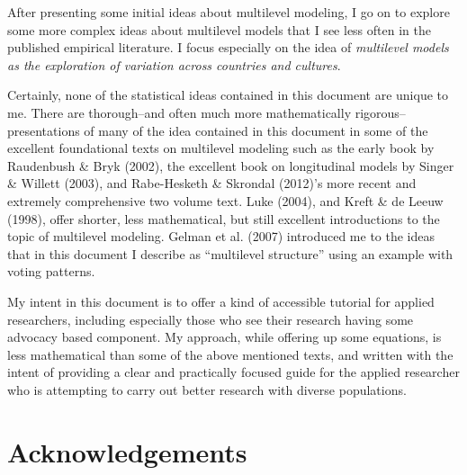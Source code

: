 \documentclass[
  letterpaper,
  DIV=11,
  numbers=noendperiod]{scrreprt}
\begin{document}
After presenting some initial ideas about multilevel modeling, I go on
to explore some more complex ideas about multilevel models that I see
less often in the published empirical literature. I focus especially on
the idea of \emph{multilevel models as the exploration of variation
across countries and cultures}.

Certainly, none of the statistical ideas contained in this document are
unique to me. There are thorough--and often much more mathematically
rigorous--presentations of many of the idea contained in this document
in some of the excellent foundational texts on multilevel modeling such
as the early book by Raudenbush \& Bryk (2002), the excellent book on
longitudinal models by Singer \& Willett (2003), and Rabe-Hesketh \&
Skrondal (2012)'s more recent and extremely comprehensive two volume
text. Luke (2004), and Kreft \& de Leeuw (1998), offer shorter, less
mathematical, but still excellent introductions to the topic of
multilevel modeling. Gelman et al. (2007) introduced me to the ideas
that in this document I describe as ``multilevel structure'' using an
example with voting patterns.

My intent in this document is to offer a kind of accessible tutorial for
applied researchers, including especially those who see their research
having some advocacy based component. My approach, while offering up
some equations, is less mathematical than some of the above mentioned
texts, and written with the intent of providing a clear and practically
focused guide for the applied researcher who is attempting to carry out
better research with diverse populations.


\hypertarget{acknowledgements}{%
\chapter*{Acknowledgements}\label{acknowledgements}}
\end{document}
